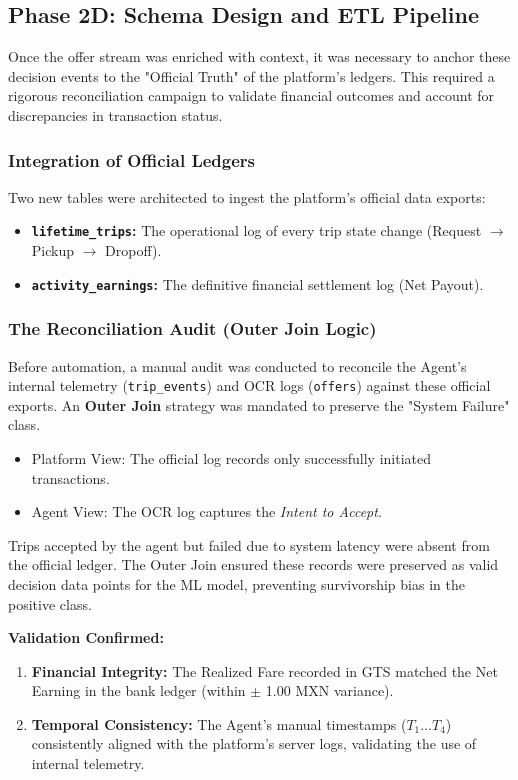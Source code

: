\subsection{Phase 2D: Schema Design and ETL Pipeline}
Once the offer stream was enriched with context, it was necessary to anchor these decision events to the "Official Truth" of the platform’s ledgers. This required a rigorous reconciliation campaign to validate financial outcomes and account for discrepancies in transaction status.

\subsubsection{Integration of Official Ledgers}
Two new tables were architected to ingest the platform's official data exports:
\begin{itemize}[noitemsep]
    \item \textbf{\texttt{lifetime\_trips}:} The operational log of every trip state change (Request $\to$ Pickup $\to$ Dropoff).
    \item \textbf{\texttt{activity\_earnings}:} The definitive financial settlement log (Net Payout).
\end{itemize}

\subsubsection{The Reconciliation Audit (Outer Join Logic)}
Before automation, a manual audit was conducted to reconcile the Agent’s internal telemetry (\texttt{trip\_events}) and OCR logs (\texttt{offers}) against these official exports. An \textbf{Outer Join} strategy was mandated to preserve the "System Failure" class. 
\begin{itemize}
    \item Platform View: The official log records only successfully initiated transactions.
    \item Agent View: The OCR log captures the \textit{Intent to Accept}.
\end{itemize}
Trips accepted by the agent but failed due to system latency were absent from the official ledger. The Outer Join ensured these records were preserved as valid decision data points for the ML model, preventing survivorship bias in the positive class.

\textbf{Validation Confirmed:}
\begin{enumerate}
    \item \textbf{Financial Integrity:} The Realized Fare recorded in GTS matched the Net Earning in the bank ledger (within $\pm$ 1.00 MXN variance).
    \item \textbf{Temporal Consistency:} The Agent’s manual timestamps ($T_1 \dots T_4$) consistently aligned with the platform’s server logs, validating the use of internal telemetry.
\end{enumerate}


